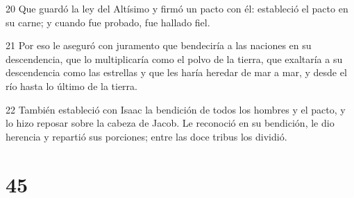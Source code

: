 \par 20 Que guardó la ley del Altísimo y firmó un pacto con él: estableció el pacto en su carne; y cuando fue probado, fue hallado fiel.
\par 21 Por eso le aseguró con juramento que bendeciría a las naciones en su descendencia, que lo multiplicaría como el polvo de la tierra, que exaltaría a su descendencia como las estrellas y que les haría heredar de mar a mar, y desde el río hasta lo último de la tierra.
\par 22 También estableció con Isaac la bendición de todos los hombres y el pacto, y lo hizo reposar sobre la cabeza de Jacob. Le reconoció en su bendición, le dio herencia y repartió sus porciones; entre las doce tribus los dividió.

\chapter{45}

